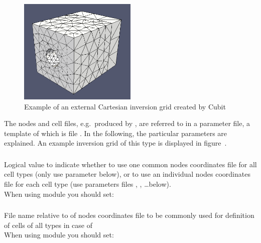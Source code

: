 \begin{figure}[ht]
  \centering
  \includegraphics[width=0.5\textwidth]{images/ecartInversionGrid_manual.png}
  \caption{Example of an external Cartesian inversion grid created by Cubit}
  \label{basic_steps,sec:invgrid,sub:ecart,fig:grid}
\end{figure}

The nodes and cell files, e.g.\ produced by , are referred to in a parameter file, a template 
of which is file . In the following, the particular 
parameters are explained. An example inversion grid of this type is displayed in 
figure~.

\subsubsection{}
Logical value to indicate whether to use one common nodes coordinates file for 
all cell types (only use parameter  below), or to use an individual 
nodes coordinates file for each cell type (use parameters files , 
, \dots below).\\
When using module  you should set:\\
\subsubsection{}
File name relative to  of nodes coordinates file to be commonly used
for definition of cells of all types in case of \\
When using module  you should set:\\
